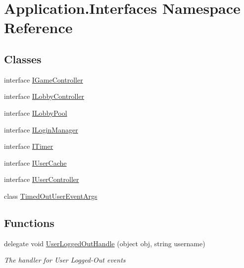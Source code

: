 \hypertarget{namespace_application_1_1_interfaces}{}\section{Application.\+Interfaces Namespace Reference}
\label{namespace_application_1_1_interfaces}
\subsection*{Classes}
\begin{DoxyCompactItemize}
\item 
interface \mbox{\hyperlink{interface_application_1_1_interfaces_1_1_i_game_controller}{I\+Game\+Controller}}
\item 
interface \mbox{\hyperlink{interface_application_1_1_interfaces_1_1_i_lobby_controller}{I\+Lobby\+Controller}}
\item 
interface \mbox{\hyperlink{interface_application_1_1_interfaces_1_1_i_lobby_pool}{I\+Lobby\+Pool}}
\item 
interface \mbox{\hyperlink{interface_application_1_1_interfaces_1_1_i_login_manager}{I\+Login\+Manager}}
\item 
interface \mbox{\hyperlink{interface_application_1_1_interfaces_1_1_i_timer}{I\+Timer}}
\item 
interface \mbox{\hyperlink{interface_application_1_1_interfaces_1_1_i_user_cache}{I\+User\+Cache}}
\item 
interface \mbox{\hyperlink{interface_application_1_1_interfaces_1_1_i_user_controller}{I\+User\+Controller}}
\item 
class \mbox{\hyperlink{class_application_1_1_interfaces_1_1_timed_out_user_event_args}{Timed\+Out\+User\+Event\+Args}}
\end{DoxyCompactItemize}
\subsection*{Functions}
\begin{DoxyCompactItemize}
\item 
delegate void \mbox{\hyperlink{namespace_application_1_1_interfaces_a3ba96a057acca29f3e2e533aeb2f30e0}{User\+Logged\+Out\+Handle}} (object obj, string username)
\begin{DoxyCompactList}\small\item\em The handler for \textquotesingle{}User Logged-\/\+Out\textquotesingle{} events \end{DoxyCompactList}\end{DoxyCompactItemize}


